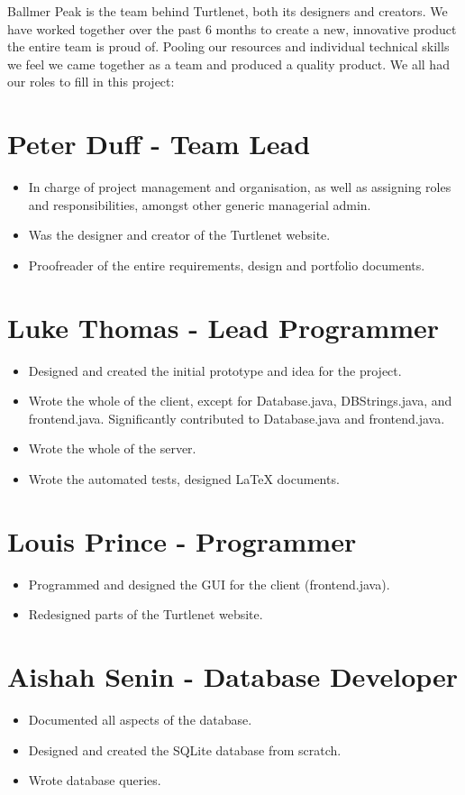 Ballmer Peak is the team behind Turtlenet, both its designers and creators.
We have worked together over the past 6 months to create a new, innovative 
product the entire team is proud of. Pooling our resources and individual
technical skills we feel we came together as a team and produced a quality
product. We all had our roles to fill in this project:

\section{Peter Duff - Team Lead}
\begin{itemize}
\item In charge of project management and organisation, as well as assigning roles and 
responsibilities, amongst other generic managerial admin.
\item Was the designer and creator of the Turtlenet website.
\item Proofreader of the entire requirements, design and portfolio documents.
\end{itemize}

\section{Luke Thomas - Lead Programmer}
\begin{itemize}
\item Designed and created the initial prototype and idea for the project.
\item Wrote the whole of the client, except for Database.java, DBStrings.java, and frontend.java. Significantly contributed to Database.java and frontend.java.
\item Wrote the whole of the server.
\item Wrote the automated tests, designed \LaTeX{} documents.
\end{itemize}

\section{Louis Prince - Programmer}
\begin{itemize}
\item Programmed and designed the GUI for the client (frontend.java).
\item Redesigned parts of the Turtlenet website.
\end{itemize}

\section{Aishah Senin - Database Developer}
\begin{itemize}
\item Documented all aspects of the database.
\item Designed and created the SQLite database from scratch.
\item Wrote database queries.
\end{itemize}

